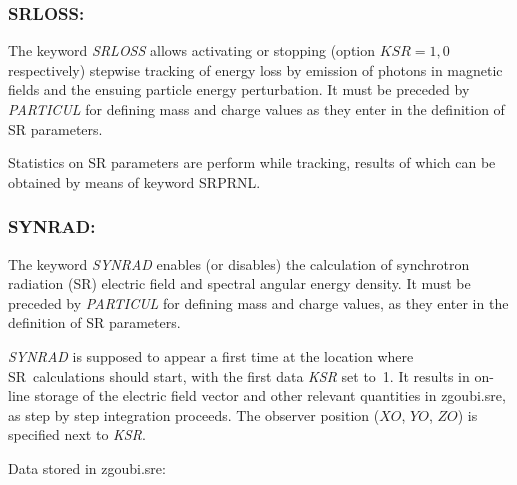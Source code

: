 \subsubsection*{SRLOSS: \SRLOSSTitl\ } \label{SRLOSS}
\cite{FMSEA-00-01}

\noindent The keyword \textsl{SRLOSS} allows activating or stopping (option $KSR=1,0$ respectively) 
 stepwise tracking  of energy loss by emission of 
photons in magnetic fields and the ensuing particle energy perturbation. It must be
preceded by \textsl{PARTICUL} for defining  mass and charge values as they enter in the 
definition of SR parameters. 


\bigskip

Statistics on SR parameters are perform while tracking, results of which can be obtained by means of keyword 
 SRPRNL. 


\newpage

\subsubsection*{SYNRAD: \SYNRADTitl}\label{SYNRAD}

\noindent The keyword \textsl{SYNRAD} enables (or disables) the calculation of 
synchrotron radiation (SR) electric field and spectral angular energy density. It must be 
preceded by \textsl{PARTICUL} for defining  mass and charge values, as they enter 
in the definition of SR parameters. 

\bigskip

\noindent\textsl{SYNRAD} is supposed to appear a first time at the 
location where SR~calculations should start, with the first data \textsl{KSR} set 
to~1. It results in on-line storage of the electric field vector and 
other relevant quantities in zgoubi.sre, as step by step integration 
proceeds. The observer position ($XO$, $YO$, $ZO$) is specified next 
to \textsl{KSR}.
\bigskip

\noindent Data stored in zgoubi.sre:
 
